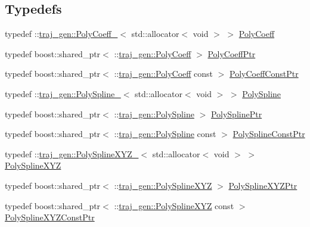 \subsection*{Typedefs}
\begin{DoxyCompactItemize}
\item 
typedef \+::\hyperlink{structtraj__gen_1_1_poly_coeff__}{traj\+\_\+gen\+::\+Poly\+Coeff\+\_\+}$<$ std\+::allocator$<$ void $>$ $>$ \hyperlink{namespacetraj__gen_a8886e1ed8c6d0913ea4e2ef5e9994268}{Poly\+Coeff}
\item 
typedef boost\+::shared\+\_\+ptr$<$ \+::\hyperlink{namespacetraj__gen_a8886e1ed8c6d0913ea4e2ef5e9994268}{traj\+\_\+gen\+::\+Poly\+Coeff} $>$ \hyperlink{namespacetraj__gen_a7dee4033e88ce14f00e980b1cb481921}{Poly\+Coeff\+Ptr}
\item 
typedef boost\+::shared\+\_\+ptr$<$ \+::\hyperlink{namespacetraj__gen_a8886e1ed8c6d0913ea4e2ef5e9994268}{traj\+\_\+gen\+::\+Poly\+Coeff} const  $>$ \hyperlink{namespacetraj__gen_aa946fcad3e6649940054ef996b4f8fb6}{Poly\+Coeff\+Const\+Ptr}
\item 
typedef \+::\hyperlink{structtraj__gen_1_1_poly_spline__}{traj\+\_\+gen\+::\+Poly\+Spline\+\_\+}$<$ std\+::allocator$<$ void $>$ $>$ \hyperlink{namespacetraj__gen_a4cc870f21a33c36c743805af48140ae8}{Poly\+Spline}
\item 
typedef boost\+::shared\+\_\+ptr$<$ \+::\hyperlink{namespacetraj__gen_a4cc870f21a33c36c743805af48140ae8}{traj\+\_\+gen\+::\+Poly\+Spline} $>$ \hyperlink{namespacetraj__gen_a44e912ff4db08ba063c8db02902fd9dc}{Poly\+Spline\+Ptr}
\item 
typedef boost\+::shared\+\_\+ptr$<$ \+::\hyperlink{namespacetraj__gen_a4cc870f21a33c36c743805af48140ae8}{traj\+\_\+gen\+::\+Poly\+Spline} const  $>$ \hyperlink{namespacetraj__gen_a4600aea34708e71c4c4e9bd52bced08c}{Poly\+Spline\+Const\+Ptr}
\item 
typedef \+::\hyperlink{structtraj__gen_1_1_poly_spline_x_y_z__}{traj\+\_\+gen\+::\+Poly\+Spline\+X\+Y\+Z\+\_\+}$<$ std\+::allocator$<$ void $>$ $>$ \hyperlink{namespacetraj__gen_acf62bcf9afe9d715d3663a61cd39b0d6}{Poly\+Spline\+X\+YZ}
\item 
typedef boost\+::shared\+\_\+ptr$<$ \+::\hyperlink{namespacetraj__gen_acf62bcf9afe9d715d3663a61cd39b0d6}{traj\+\_\+gen\+::\+Poly\+Spline\+X\+YZ} $>$ \hyperlink{namespacetraj__gen_abe722a2745301b8f42f798c46825620a}{Poly\+Spline\+X\+Y\+Z\+Ptr}
\item 
typedef boost\+::shared\+\_\+ptr$<$ \+::\hyperlink{namespacetraj__gen_acf62bcf9afe9d715d3663a61cd39b0d6}{traj\+\_\+gen\+::\+Poly\+Spline\+X\+YZ} const  $>$ \hyperlink{namespacetraj__gen_a9638044f096a0c6553bcf3972c4e2c6e}{Poly\+Spline\+X\+Y\+Z\+Const\+Ptr}

\end{DoxyCompactItemize}
